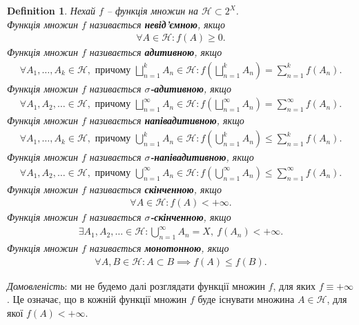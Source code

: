 \documentclass[a4paper, 10pt]{article}
\theoremstyle{theoremdd}
\newtheorem{definition}[theorem]{Definition}
\begin{document}
\begin{definition}
Нехай $f$ -- функція множин на $\mathcal{H} \subset 2^X$.\\
Функція множин $f$ називається \textbf{невід'ємною}, якщо
\begin{align*}
\forall A \in \mathcal{H}: f(A) \geq 0.
\end{align*}
Функція множин $f$ називається \textbf{адитивною}, якщо
\begin{align*}
\forall A_1,\dots,A_k \in \mathcal{H}, \text{ причому } \bigsqcup_{n=1}^k A_n \in \mathcal{H}: f\left( \bigsqcup_{n=1}^k A_n \right) = \sum_{n=1}^k f(A_n).
\end{align*}
Функція множин $f$ називається \textbf{$\sigma$-адитивною}, якщо
\begin{align*}
\forall A_1,A_2,\dots \in \mathcal{H}, \text{ причому } \bigsqcup_{n=1}^\infty A_n \in \mathcal{H}: f\left( \bigsqcup_{n=1}^\infty A_n \right) = \sum_{n=1}^\infty f(A_n).
\end{align*}
Функція множин $f$ називається \textbf{напівадитивною}, якщо
\begin{align*}
\forall A_1,\dots,A_k \in \mathcal{H}, \text{ причому } \bigcup_{n=1}^k A_n \in \mathcal{H}: f\left( \bigcup_{n=1}^k A_n \right) \leq \sum_{n=1}^k f(A_n).
\end{align*}
Функція множин $f$ називається \textbf{$\sigma$-напівадитивною}, якщо
\begin{align*}
\forall A_1,A_2,\dots \in \mathcal{H}, \text{ причому } \bigcup_{n=1}^\infty A_n \in \mathcal{H}: f\left( \bigcup_{n=1}^\infty A_n \right) \leq \sum_{n=1}^\infty f(A_n).
\end{align*}
Функція множин $f$ називається \textbf{скінченною}, якщо
\begin{align*}
\forall A \in \mathcal{H}: f(A) < +\infty.
\end{align*}
Функція множин $f$ називається \textbf{$\sigma$-скінченною}, якщо
\begin{align*}
\exists A_1,A_2, \dots \in \mathcal{H}: \bigcup_{n=1}^\infty A_n = X,\ f(A_n) < +\infty.
\end{align*}
Функція множин $f$ називається \textbf{монотонною}, якщо
\begin{align*}
\forall A,B \in \mathcal{H}: A \subset B \implies f(A) \leq f(B).
\end{align*} 
\end{definition}
\noindent
\textit{Домовленість}: ми не будемо далі розглядати функції множин $f$, для яких $f \equiv +\infty$. Це означає, що в кожній функції множин $f$ буде існувати множина $A \in \mathcal{H}$, для якої $f(A) < +\infty$.
\end{document}
